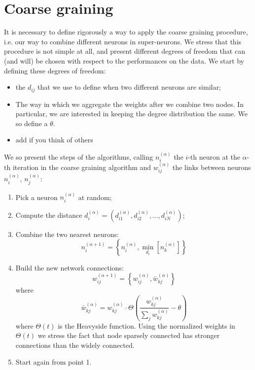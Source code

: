 \section{Coarse graining}
It is necessary to define rigorously a way to apply the 
coarse graining procedure, i.e. our way to combine different
neurons in super-neurons. We stress that this procedure
is not simple at all, and present different degrees of freedom
that can (and will) be chosen with respect to the performances
on the data. We start by defining these degrees of freedom:
\begin{itemize}
    \item the  $d_{ij}$ that we use to define when two 
        different neurons are similar;
    \item The way in which we aggregate the weights after we combine 
        two nodes. In particular, we are interested in keeping the 
        degree distribution the same. We so define a  $\theta$.
    \item add if you think of others
\end{itemize}
We so present the steps of the algorithms, calling $n_i^{(\alpha)}$ the $i$-th 
neuron at the $\alpha$-th iteration in the coarse graining algorithm and $w_{ij}^{(\alpha)}$
the links between neurons $n_i^{(\alpha)}$, $n_j^{(\alpha)}$:
\begin{enumerate}
    \item Pick a neuron $n_i^{(\alpha)}$ at random;
    \item Compute the distance $d_i^{(\alpha)}=(d_{i1}^{(\alpha)}, d_{i2}^{(\alpha)}, \dots, d_{iN}^{(\alpha)})$;
    \item Combine the two nearest neurons:
        $$
        n_i^{(\alpha+1)} = \left\{ n_i^{(\alpha)}, \min_{d_i}\left[n_k^{(\alpha)}\right] \right\}
        $$
    \item Build the new network connections:
        $$
        w_{ij}^{(\alpha+1)} = \left\{ w_{ij}^{(\alpha)}, \bar{w}_{kj}^{(\alpha)}   \right\}
        $$
        where
        $$
        \bar{w}_{kj}^{(\alpha)}= w_{kj}^{(\alpha)}\cdot \Theta\left( \frac{w_{kj}^{(\alpha)}}{\sum_j w_{kj}^{(\alpha)}}-\theta \right)
        $$
        where $\Theta(t)$ is the Heavyside function. Using the normalized weights in $\Theta(t)$ we
        stress the fact that node sparsely connected has stronger connections than the widely connected.
    \item Start again from point 1.
\end{enumerate} 



